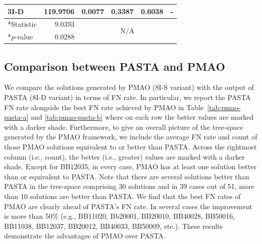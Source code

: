 \documentclass[a4paper,fleqn, review]{cas-dc}
\begin{document}
\begin{table}[!htbp]
\begin{tabular}{|l|r||c|c|c|c|}
		\hline
		3I-D & 119.9706 & \multicolumn{1}{r|}{\cellcolor[rgb]{ .384,  .745,  .478}0.0077} & \multicolumn{1}{r|}{0.3387} & \multicolumn{1}{r|}{0.6038} & - \\
		\hline \hline
		*Statistic & 9.0393 & \multicolumn{4}{c|}{\multirow{2}{*}{N/A}} \\
		\cline{1-2}    *$p$-value & 0.0288 & \multicolumn{4}{c|}{} \\
		\hline
	\end{tabular}\label{tab:test-pmao-variants}
\end{table}

\subsection{Comparison between PASTA and PMAO}
We compare the solutions generated by PMAO (8I-S variant) with the output of PASTA (8I-D variant) in terms of FN rate. In particular, we report the PASTA FN rate alongside the best FN rate achieved by PMAO in Table~\ref{tab:pmao-pasta-a} and \ref{tab:pmao-pasta-b} where on each row the better values are marked with a darker shade. Furthermore, to give an overall picture of the tree-space generated by the PMAO framework, we include the average FN rate and count of those PMAO solutions equivalent to or better than PASTA. Across the rightmost column (i.e., count), the better (i.e., greater) values are marked with a darker shade. Except for BB12035, in every case, PMAO has at least one solution better than or equivalent to PASTA. Note that there are several solutions better than PASTA in the tree-space comprising 30 solutions and in 39 cases out of 51, more than 10 solutions are better than PASTA. We find that the best FN rates of PMAO are clearly ahead of PASTA's FN rate. In several cases the improvement is more than 50\% (e.g., BB11020, Bb20001, BB20010, BB40028, BB50016, BB11038, BB12037, BB20012, BB40033, BB50009, etc.). These results demonstrate the advantages of PMAO over PASTA.
\end{document}
